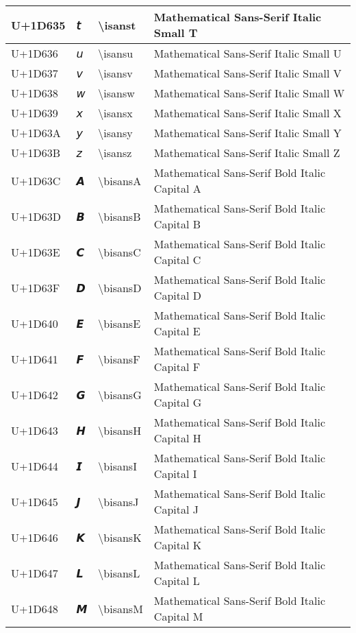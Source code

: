 \begin{table}[h]
\begin{tabulary}{\linewidth}{|L|L|L|L|}
\hline
U+1D635 & 𝘵 & {\textbackslash}isanst & Mathematical Sans-Serif Italic Small T \\
\hline
U+1D636 & 𝘶 & {\textbackslash}isansu & Mathematical Sans-Serif Italic Small U \\
\hline
U+1D637 & 𝘷 & {\textbackslash}isansv & Mathematical Sans-Serif Italic Small V \\
\hline
U+1D638 & 𝘸 & {\textbackslash}isansw & Mathematical Sans-Serif Italic Small W \\
\hline
U+1D639 & 𝘹 & {\textbackslash}isansx & Mathematical Sans-Serif Italic Small X \\
\hline
U+1D63A & 𝘺 & {\textbackslash}isansy & Mathematical Sans-Serif Italic Small Y \\
\hline
U+1D63B & 𝘻 & {\textbackslash}isansz & Mathematical Sans-Serif Italic Small Z \\
\hline
U+1D63C & 𝘼 & {\textbackslash}bisansA & Mathematical Sans-Serif Bold Italic Capital A \\
\hline
U+1D63D & 𝘽 & {\textbackslash}bisansB & Mathematical Sans-Serif Bold Italic Capital B \\
\hline
U+1D63E & 𝘾 & {\textbackslash}bisansC & Mathematical Sans-Serif Bold Italic Capital C \\
\hline
U+1D63F & 𝘿 & {\textbackslash}bisansD & Mathematical Sans-Serif Bold Italic Capital D \\
\hline
U+1D640 & 𝙀 & {\textbackslash}bisansE & Mathematical Sans-Serif Bold Italic Capital E \\
\hline
U+1D641 & 𝙁 & {\textbackslash}bisansF & Mathematical Sans-Serif Bold Italic Capital F \\
\hline
U+1D642 & 𝙂 & {\textbackslash}bisansG & Mathematical Sans-Serif Bold Italic Capital G \\
\hline
U+1D643 & 𝙃 & {\textbackslash}bisansH & Mathematical Sans-Serif Bold Italic Capital H \\
\hline
U+1D644 & 𝙄 & {\textbackslash}bisansI & Mathematical Sans-Serif Bold Italic Capital I \\
\hline
U+1D645 & 𝙅 & {\textbackslash}bisansJ & Mathematical Sans-Serif Bold Italic Capital J \\
\hline
U+1D646 & 𝙆 & {\textbackslash}bisansK & Mathematical Sans-Serif Bold Italic Capital K \\
\hline
U+1D647 & 𝙇 & {\textbackslash}bisansL & Mathematical Sans-Serif Bold Italic Capital L \\
\hline
U+1D648 & 𝙈 & {\textbackslash}bisansM & Mathematical Sans-Serif Bold Italic Capital M \\

\end{tabulary}
\end{table}
